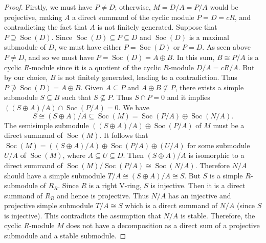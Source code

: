 \documentclass[10pt,a4paper]{amsart}
\newcommand{\Soc}{\operatorname{Soc}}
\begin{document}
\begin{proof}
Firstly, we must have $ P\neq D $; otherwise, $M=D/A=P/A$ would be projective, making $ A $  a direct summand of the cyclic module $P=D=cR$, and contradicting the fact that $ A $ is not finitely generated. Suppose that $P\supseteq \Soc(D)$. Since $\Soc(D)\subseteq P \subseteq D$ and $\Soc(D)$ is a maximal submodule of $D$, we must have either $P=\Soc(D)$ or $P=D$. As seen above $P\neq D$, and so we must have $P=\Soc(D)=A\oplus B$. In this sum, $B\cong  P/A$ is a cyclic $R$-module since it is a quotient of the cyclic $R$-module $D/A=cR/A$. But by our choice, $B$ is not finitely generated, leading to a contradiction. Thus $P\nsupseteq \Soc(D)=A\oplus B$. Given $A\subseteq P$ and $A\oplus B\nsubseteq P$, there exists a simple submodule $S\subseteq B$ such that $S \nsubseteq P$. Thus $S\cap P=0$ and it implies $\left((S\oplus A)/A\right)\cap \Soc(P/A)=0$. We have
 \[S\cong(S\oplus A)/ A \subseteq \Soc(M)=\Soc(P/A)\oplus \Soc(N/A).\]
 The {semisimple submodule  $\left((S\oplus A)/A\right) \oplus \Soc(P/A) $ of $ M $ must be a direct summand of $ \Soc(M) $. It follows that} $\Soc(M)= ((S\oplus A)/A) \oplus  \Soc(P/A) \oplus (U/A)$ for some submodule $U/A$ of $\Soc(M)$, where $A\subseteq U\subseteq D$. Then $(S\oplus A)/A$ is isomorphic to a direct summand of $\Soc(M)/\Soc(P/A)\cong \Soc(N/A)$. Therefore $N/A$ should have a simple submodule $T/A\cong (S\oplus A)/ A \cong S$. But $S$ is a simple $R$-submodule of $R_R$. Since $R$ is a right V-ring, $S$ is injective. Then it is a direct summand of $R_R$ and hence is projective. Thus $N/A$ has an injective and projective simple submodule $T/A \cong S$ which is a direct summand of $N/A$ (since $S$ is injective). This contradicts the assumption that $N/A$ {is stable}. Therefore, the cyclic $R$-module $M$ does not have a decomposition as a direct sum of a projective submodule and a stable submodule.
\end{proof}
\end{document}
